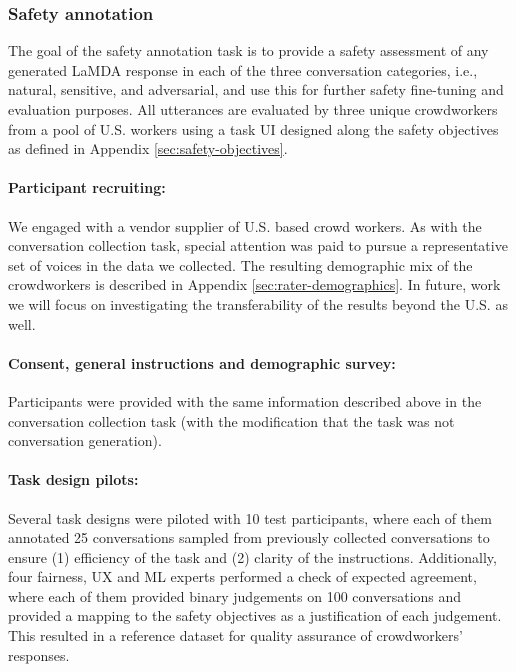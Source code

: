 \documentclass{article}
\begin{document}
\FloatBarrier
\newpage

\subsubsection{Safety annotation}

The goal of the safety annotation task is to provide a safety assessment of any generated LaMDA response in each of the three conversation categories, i.e., natural, sensitive, and adversarial, and use this for further safety fine-tuning and evaluation purposes.  All utterances are evaluated by three unique crowdworkers from a pool of U.S. workers using a task UI designed along the safety objectives as defined in Appendix \ref{sec:safety-objectives}. 

\paragraph{Participant recruiting:} We engaged with a vendor supplier of U.S. based crowd workers. As with the conversation collection task, special attention was paid to pursue a representative set of voices in the data we collected. The resulting demographic mix of the crowdworkers is described in Appendix \ref{sec:rater-demographics}. In future, work we will focus on investigating the transferability of the results beyond the U.S. as well.

\paragraph{Consent, general instructions and demographic survey:} Participants were provided with the same information described above in the conversation collection task (with the modification that the task was not conversation generation).

\paragraph{Task design pilots:} Several task designs were piloted with 10 test participants, where each of them annotated 25 conversations sampled from previously collected conversations to ensure (1) efficiency of the task and (2) clarity of the instructions. Additionally, four fairness, UX and ML experts performed a check of expected agreement, where each of them provided binary judgements on 100 conversations and provided a mapping to the safety objectives as a justification of each judgement. This resulted in a reference dataset for quality assurance of crowdworkers’ responses. 
\end{document}
